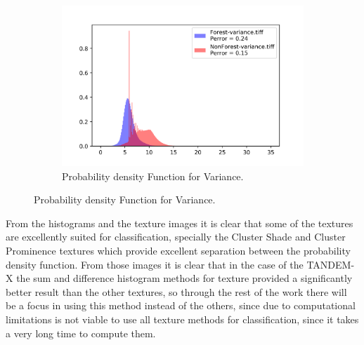 \begin{figure}[H]
  \centering
  \begin{subfigure}[b]{0.4\linewidth}
    \includegraphics[width=\linewidth]{Chapter4/sum_and_diff_textures/variance_hist.png}
     \caption{Probability density Function for Variance.}
  \end{subfigure}
  
\end{figure}

From the histograms and the texture images it is clear that some of the textures are excellently suited for classification, specially the Cluster Shade and Cluster Prominence textures which provide excellent separation between the probability density function. From those images it is clear that in the case of the TANDEM-X the sum and difference histogram methods for texture provided a significantly better result than the other textures, so through the rest of the work there will be a focus in using this method instead of the others, since due to computational limitations is not viable to use all texture methods for classification, since it takes a very long time to compute them.
